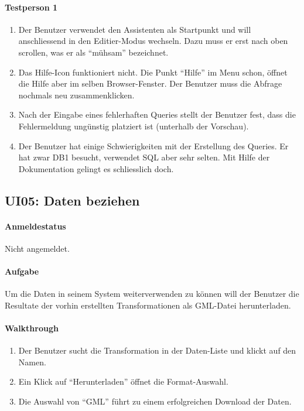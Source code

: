 \paragraph{Testperson 1}
\begin{enumerate}
\item Der Benutzer verwendet den Assistenten als Startpunkt und will anschliessend in den Editier-Modus wechseln. Dazu muss er erst nach oben scrollen, was er als ``mühsam'' bezeichnet.
\item Das Hilfe-Icon funktioniert nicht. Die Punkt ``Hilfe'' im Menu schon, öffnet die Hilfe aber im selben Browser-Fenster. Der Benutzer muss die Abfrage nochmals neu zusammenklicken.
\item Nach der Eingabe eines fehlerhaften Queries stellt der Benutzer fest, dass die Fehlermeldung ungünstig platziert ist (unterhalb der Vorschau).
\item Der Benutzer hat einige Schwierigkeiten mit der Erstellung des Queries. Er hat zwar DB1 besucht, verwendet SQL aber sehr selten. Mit Hilfe der Dokumentation gelingt es schliesslich doch.
\end{enumerate}

\subsection{UI05: Daten beziehen}
\paragraph{Anmeldestatus} Nicht angemeldet.
\paragraph{Aufgabe} Um die Daten in seinem System weiterverwenden zu können will der Benutzer die Resultate der vorhin erstellten Transformationen als GML-Datei herunterladen.

\paragraph{Walkthrough}
\begin{enumerate}
\item Der Benutzer sucht die Transformation in der Daten-Liste und klickt auf den Namen.
\item Ein Klick auf ``Herunterladen'' öffnet die Format-Auswahl.
\item Die Auswahl von ``GML'' führt zu einem erfolgreichen Download der Daten.
\end{enumerate}

